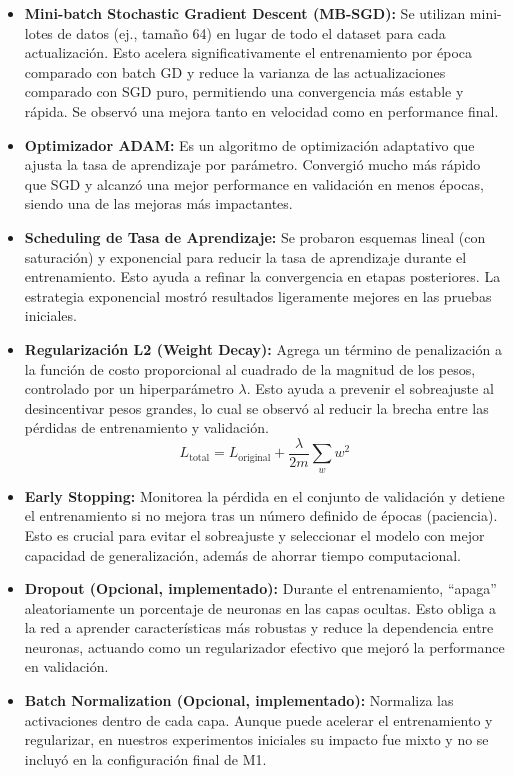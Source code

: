 \documentclass[11pt]{article}
\begin{document}
\begin{itemize}
    \item \textbf{Mini-batch Stochastic Gradient Descent (MB-SGD):} Se utilizan mini-lotes de datos (ej., tamaño 64) en lugar de todo el dataset para cada actualización. Esto acelera significativamente el entrenamiento por época comparado con batch GD y reduce la varianza de las actualizaciones comparado con SGD puro, permitiendo una convergencia más estable y rápida. Se observó una mejora tanto en velocidad como en performance final.
    \item \textbf{Optimizador ADAM:} Es un algoritmo de optimización adaptativo que ajusta la tasa de aprendizaje por parámetro. Convergió mucho más rápido que SGD y alcanzó una mejor performance en validación en menos épocas, siendo una de las mejoras más impactantes.
    \item \textbf{Scheduling de Tasa de Aprendizaje:} Se probaron esquemas lineal (con saturación) y exponencial para reducir la tasa de aprendizaje durante el entrenamiento. Esto ayuda a refinar la convergencia en etapas posteriores. La estrategia exponencial mostró resultados ligeramente mejores en las pruebas iniciales.
    \item \textbf{Regularización L2 (Weight Decay):} Agrega un término de penalización a la función de costo proporcional al cuadrado de la magnitud de los pesos, controlado por un hiperparámetro $\lambda$. Esto ayuda a prevenir el sobreajuste al desincentivar pesos grandes, lo cual se observó al reducir la brecha entre las pérdidas de entrenamiento y validación.
    $$L_{\text{total}} = L_{\text{original}} + \frac{\lambda}{2m} \sum_{w} w^2$$
    \item \textbf{Early Stopping:} Monitorea la pérdida en el conjunto de validación y detiene el entrenamiento si no mejora tras un número definido de épocas (paciencia). Esto es crucial para evitar el sobreajuste y seleccionar el modelo con mejor capacidad de generalización, además de ahorrar tiempo computacional.
    \item \textbf{Dropout (Opcional, implementado):} Durante el entrenamiento, ``apaga'' aleatoriamente un porcentaje de neuronas en las capas ocultas. Esto obliga a la red a aprender características más robustas y reduce la dependencia entre neuronas, actuando como un regularizador efectivo que mejoró la performance en validación.
    \item \textbf{Batch Normalization (Opcional, implementado):} Normaliza las activaciones dentro de cada capa. Aunque puede acelerar el entrenamiento y regularizar, en nuestros experimentos iniciales su impacto fue mixto y no se incluyó en la configuración final de M1.
\end{itemize}
\end{document}
